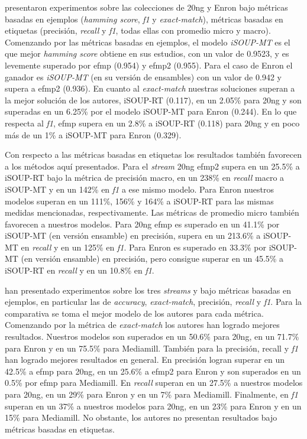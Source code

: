 \citeauthor{osojnik_multi-label_2017} presentaron experimentos sobre las
colecciones de 20ng y Enron bajo métricas basadas en ejemplos (\textit{hamming
	score}, \textit{f1} y \textit{exact-match}), métricas basadas en etiquetas
(precisión, \textit{recall} y \textit{f1}, todas ellas con promedio micro y
macro). Comenzando por las métricas basadas en ejemplos, el modelo
\textit{iSOUP-MT} es el que mejor \textit{hamming score} obtiene en sus
estudios, con un valor de 0.9523, y es levemente superado por \acrshort{efmp}
(0.954) y \acrshort{efmp2} (0.955). Para el caso de Enron el ganador es
\textit{iSOUP-MT} (en su versión de ensambles) con un valor de 0.942 y supera a
\acrshort{efmp2} (0.936). En cuanto al \textit{exact-match} nuestras soluciones
superan a la mejor solución de los autores, iSOUP-RT (0.117), en un 2.05\% para
20ng y son superadas en un 6.25\% por el modelo iSOUP-MT para Enron (0.244). En
lo que respecta al \textit{f1}, \acrshort{efmp} supera en un 2.8\% a iSOUP-RT
(0.118) para 20ng y en poco más de un 1\% a iSOUP-MT para Enron (0.329).

Con respecto a las métricas basadas en etiquetas los resultados también
favorecen a los métodos aquí presentados. Para el \textit{stream} 20ng
\acrshort{efmp2} supera en un 25.5\% a iSOUP-RT bajo la métrica de precisión
macro, en un 238\% en \textit{recall} macro a iSOUP-MT y en un 142\% en
\textit{f1} a ese mismo modelo. Para Enron nuestros modelos superan en un 111\%,
156\% y 164\% a iSOUP-RT para las mismas medidas mencionadas, respectivamente.
Las métricas de promedio micro también favorecen a nuestros modelos. Para 20ng
\acrshort{efmp} es superado en un 41.1\% por iSOUP-MT (en versión ensamble) en
precisión, supera en un 213.6\% a iSOUP-MT en \textit{recall} y en un 125\% en
\textit{f1}. Para Enron es superado en 33.3\% por iSOUP-MT (en versión ensamble)
en precisión, pero consigue superar en un 45.5\% a iSOUP-RT en \textit{recall} y
en un 10.8\% en \textit{f1}.

\citeauthor{sousa_multi-label_2018} han presentado experimentos sobre los tres
\textit{streams} y bajo métricas basadas en ejemplos, en particular las de
\textit{accuracy}, \textit{exact-match}, precisión, \textit{recall} y
\textit{f1}. Para la comparativa se toma el mejor modelo de los autores para
cada métrica. Comenzando por la métrica de \textit{exact-match} los autores han
logrado mejores resultados. Nuestros modelos son superados en un 50.6\% para
20ng, en un 71.7\% para Enron y en un 75.5\% para Mediamill. También para la
precisión, recall y \textit{f1} \citeauthor{sousa_multi-label_2018} han logrado
mejores resultados en general.  En precisión logran superar en un 42.5\% a
\acrshort{efmp} para 20ng, en un 25.6\% a \acrshort{efmp2} para Enron y son
superados en un 0.5\% por \acrshort{efmp} para Mediamill. En \textit{recall}
superan en un 27.5\% a nuestros modelos para 20ng, en un 29\% para Enron y en un
7\% para Mediamill.  Finalmente, en \textit{f1} superan en un 37\% a nuestros
modelos para 20ng, en un 23\% para Enron y en un 15\% para Mediamill. No
obstante, los autores no presentan resultados bajo métricas basadas en
etiquetas.

